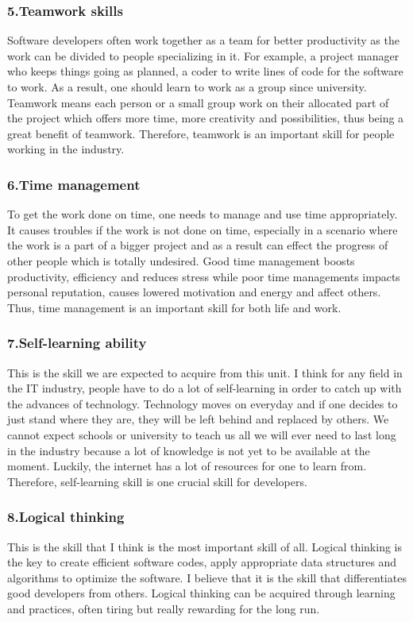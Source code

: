 \documentclass[a4paper, 11pt]{report}
\begin{document}
	\subsubsection{5.Teamwork skills}
	 Software developers often work together as a team for better productivity as the work can be divided to people specializing in it. For example, a project manager who keeps things going as planned, a coder to write lines of code for the software to work.
As a result, one should learn to work as a group since university. Teamwork means each person or a small group work on their allocated part of the project which offers more time, more creativity and possibilities, thus being a great benefit of teamwork. Therefore, teamwork is an important skill for people working in the industry.
	\subsubsection{6.Time management}
	 To get the work done on time, one needs to manage and use time appropriately. It causes troubles if the work is not done on time, especially in a scenario where the work is a part of a bigger project and as a result can effect the progress of other people which is totally undesired. Good time management boosts productivity, efficiency and reduces stress while poor time managements impacts personal reputation, causes lowered motivation and energy and affect others. Thus, time management is an important skill for both life and work.
	\subsubsection{7.Self-learning ability}
	 This is the skill we are expected to acquire from this unit. I think for any field in the IT industry, people have to do a lot of self-learning in order to catch up with the advances of technology. Technology moves on everyday and if one decides to just stand where they are, they will be left behind and replaced by others. We cannot expect schools or university to teach us all we will ever need to last long in the industry  because a lot of knowledge is not yet to be available at the moment. Luckily, the internet has a lot of resources for one to learn from. Therefore, self-learning skill is one crucial skill for developers.
	\subsubsection{8.Logical thinking}
	 This is the skill that I think is the most important skill of all. Logical thinking is the key to create efficient software codes, apply appropriate data structures and algorithms to  optimize the software. I believe that it is the skill that differentiates good developers from others. Logical thinking can be acquired through learning and practices, often tiring but really rewarding for the long run. 
\end{document}
